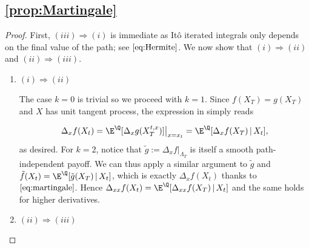
\subsection{\cref{prop:Martingale}}
\label{app:Martingale}


\begin{proof} First,  $(iii) \Longrightarrow (i)$ is immediate as  It\^o iterated integrals only depends on the final value of the path; see  $\eqref{eq:Hermite}$. %
We now show that $(i) \Longrightarrow (ii)$ and $(ii) \Longrightarrow (iii)$.

\begin{enumerate}

    \item $(i) \Longrightarrow (ii)$ 
    
    The case $k=0$ is trivial so we proceed with $k=1$. Since $f(X_T)=g(X_T)$ and $X$ has unit tangent process, the expression in  simply reads

\begin{equation}\label{eq:martingale}
    \Delta_xf(X_t) = \E^{\Q}[\Delta_{x}g(X^{t,x}_T)]\big |_{x=x_t} = \E^{\Q}[\Delta_{x}f(X_T) \, | \, X_t], 
\end{equation}
as desired. For $k =2$, notice that $\tilde{g} :=\Delta_{x}f\big |_{\Lambda_T}$ is itself a smooth path-independent payoff. We can thus apply a similar argument to $\tilde{g}$ and $\tilde{f}(X_t)=\E^{\Q}[\tilde{g}(X_T)\,|\,X_t]$, which is exactly $\Delta_{x}f(X_t)$ thanks to $\eqref{eq:martingale}$. Hence $\Delta_{xx}f(X_t) = \E^{\Q}[\Delta_{xx}f(X_T) \, | \, X_t]$ and the same holds for higher %
derivatives.

\item $(ii) \Longrightarrow (iii)$


\end{enumerate}
\end{proof}
